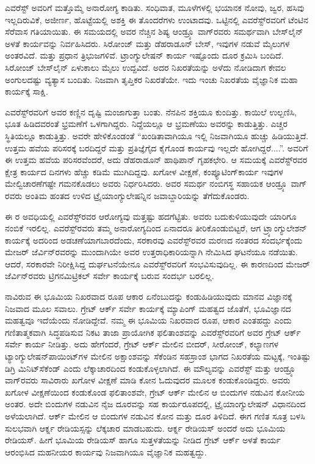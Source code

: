 ಎವರೆಸ್ಟ್​ ಅವರಿಗೆ ಮತ್ತೊಮ್ಮೆ ಅನಾರೋಗ್ಯ ಕಾಡಿತು. ಸಂಧಿವಾತ, ಮೂಳೆಗಳಲ್ಲಿ ಭಯಾನಕ ನೋವು, ಜ್ವರ, ಹಸಿವು ಇಲ್ಲದಿರುವಿಕೆ, ಅಜೀರ್ಣ, ಹೊಟ್ಟೆಯಲ್ಲಿ ಅಶಕ್ತಿ ಈ ತೊಂದರೆಗಳು ಉಂಟಾದವು. ಒಟ್ಟಿನಲ್ಲಿ ಎವರೆಸ್ಟ್​ರವರಿಗೆ ಟೆಂಟಿನ ಸೆರೆವಾಸ ಗತಿಯಾಯಿತು. ಈ ಸಮಯದಲ್ಲಿ ಅವರ ನೆಚ್ಚಿನ ಶಿಷ್ಯ ಆಂಡ್ರ್ಯೂ ವಾಗ್​ರವರು ಸಮರ್ಥವಾಗಿ ಬೇಸ್​ಲೈನ್​ ಅಳತೆ ಕಾರ್ಯವನ್ನು ನಿರ್ವಹಿಸಿದರು. ಸಿರೋಂಜ್​ ಮತ್ತು ಡೆಹರಾಡೂನ್​ ಬೇಸ್​, ಇವುಗಳ ನಡುವೆ  ಮೈಲುಗಳ ಅಂತರವಿದೆ. ಮತ್ತು  ಪ್ರಧಾನ ತ್ರಿಭುಜಗಳಿವೆ. ಟ್ರಾಂಗ್ಯುಲೇಷನ್​ ಕಾರ್ಯ ಇಷ್ಟೊಂದು ದೂರ ಕ್ರಮಿಸಿ ಬಂದಿದೆ. ಸಿರೋಂಜ್​ ಬೇಸ್​ ಲೈನ್​ ಏಳುಕಾಲು ಮೈಲು ಉದ್ದವಿದೆ. ಅದರ ನಿಖರತೆಯನ್ನು ಅಳೆದು ನೋಡಿದಾಗ ಕೇವಲ  ಅಂಗುಲದಷ್ಟು ವ್ಯತ್ಯಾಸ ಬಂದಿತು. ನಿಜವಾಗಿ ತೃಪ್ತಿಕರ ನಿಖರತೆಯೇ. ಇದು ಇಂಚು ನಿಖರತೆಯ ವೈಜ್ಞಾನಿಕ ಮಹಾ ಕಾರ್ಯಕ್ಕೆ ಸಾಕ್ಷಿ.

ಎವರೆಸ್ಟ್​ರವರಿಗೆ ಅವರ ಕಣ್ಣಿನ ದೃಷ್ಟಿ ಮಂಜಾಗುತ್ತಾ ಬಂತು. ನೆನಪಿನ ಶಕ್ತಿಯೂ ಕುಂದಿತ್ತು. ಕಾಯಿಲೆ ಉಲ್ಬಣಿಸಿ, ಭೂತ ಹಿಡಿದವರಂತೆ ಭ್ರಮಣೆಗೆ ಒಳಗಾಗಿದ್ದರು. ನಿದ್ದೆಯಲ್ಲೂ ಆ ಭ್ರಮಣೆಯು ಅವರನ್ನು ಕಾಡುತ್ತಿತ್ತು. ಎಚ್ಚರ ಸ್ಥಿತಿಯಲ್ಲೂ ಕಾಡುತ್ತಿತ್ತು. ಅವರೇ ಹೇಳಿಕೊಂಡಂತೆ “ಖಂಡಿತಾವಾಗಿಯೂ ಇಲ್ಲಿ ನಿಜವಾಗಿಯೂ ಹುಚ್ಚು ಹಿಡಿಯುತ್ತಿದೆ. ಉತ್ತಮ ಹವೆಯ ಪರಿಸರಕ್ಕೆ ಬರದಿದ್ದರೆ ಮತ್ತು ಪ್ರತಿಜ್ಞೆಗೈದ ಕೈಗೊಂಡ ಕಾರ್ಯವು ಇಲ್ಲದೇ ಹೋಗಿದ್ದರೆ....”. ಅವರಿಗೆ ಈ ಉತ್ತಮ ಹವೆಯ ಪರಿಸರವೆಂದರೆ, ಅದು ಡೆಹರಾಡೂನ್​ ಹಾಥಿಪಾನ್​ ಗೃಹಕಛೇರಿ. ಆ ಸಮಯಕ್ಕೆ ಎವರೆಸ್ಟ್​ರವರ ಕ್ಷೇತ್ರ ಕಾರ್ಯದ ದಿನಗಳು ಹೆಚ್ಚು ಕಡಿಮೆ ಮುಗಿದಿದ್ದವು. ಖಗೋಳ ವೀಕ್ಷಣೆ, ಕಂಪ್ಯೂಟಿಂಗ್​ ಕಾರ್ಯ ಇವುಗಳ ಮೇಲ್ವಿಚಾರಣೆಗಷ್ಟೇ ಗಮನಕೊಡಲು ಅವರು ನಿರ್ಧರಿಸಿದರು. ಅವರ ಸಮರ್ಥ ನಂಬಿಗಸ್ಥ ಸಹಾಯಕ ಆಂಡ್ರ್ಯೂ ವಾಗ್​ರವರು ಅಂತಿಮ ಹಂತದ ಉಳಿದ ಟ್ರೈಯಾಂಗ್ಯುಲೇಷನ್ನಿನ ಜವಾಬ್ದಾರಿಯನ್ನು ತೆಗೆದುಕೊಂಡರು.

ಈ ರ ಅವಧಿಯಲ್ಲಿ ಎವರೆಸ್ಟ್​ರವರ ಆರೋಗ್ಯವು ಮತ್ತಷ್ಟು ಹದಗೆಟ್ಟಿತು. ಅವರು ಬದುಕುಳಿಯುವುದೇ ಯಾರಿಗೂ ನಂಬಿಕೆ ಇರಲಿಲ್ಲ. ಎವರೆಸ್ಟ್​ರವರು ತಮ್ಮ ಅನಾರೋಗ್ಯದಿಂದ ಏನಾದರೂ ತೀರಿಕೊಂಡುಬಿಟ್ಟರೆ, ಆಗ ಟ್ರ್ಯಾಂಗ್ಯುಲೇಶನ್​ ಕಾರ್ಯಕ್ಕೆ ಅದರಿಂದ ಅಡಚಣೆಯಾಗಬಾರದೆಂದು, ಸರಕಾರವು ಎವರೆಸ್ಟ್​ರವರ ಮರಣದ ನಂತರದ ಸಂದರ್ಭಕ್ಕೆಂದು ಮೇಜರ್​ ಜೆರ್ವಿನ್​ರವರನ್ನು ಮುಂದಾಗಿಯೇ ಅವರ ಉತ್ತರಾಧಿಕಾರಿಯನ್ನಾಗಿ ನೇಮಿಸಿದ ಘಟನೆಯೂ ನಡೆಯಿತು. ಆದರೆ, ಸರಕಾರವೇ ನಿರೀಕ್ಷಿಸಿದ್ದ ದುರ್ಘಟನೆಯೇನೂ ಎವರೆಸ್ಟ್​\break ರವರಿಗೆ ಸಂಭವಿಸುವುದಿಲ್ಲ. ಈ ಕಾರಣದಿಂದ ಮೇಜರ್​ ಜೆರ್ವಿನ್​ರವರು ಟ್ರಿಗನಮಿಟ್ರಿಕಲ್​ ಸರ್ವೇ ಕಾರ್ಯಕ್ಕೆ ಬರುವ ಸಂದರ್ಭ ಬರಲಿಲ್ಲ.

ನಾವಿರುವ ಈ ಭೂಮಿಯ ನಿಖರವಾದ ರೂಪ ಆಕಾರ ಏನೆಂಬುದನ್ನು ಕಂಡುಹಿಡಿಯುವುದು ಮಾನವ ವಿಜ್ಞಾನಕ್ಕೆ ನಿಜವಾದ ಮೂಲ ಸವಾಲು. ಗ್ರೇಟ್​ ಆರ್ಕ್ ಸರ್ವೇ ಕಾರ್ಯಕ್ಕೆ ಮ್ಯಾಪಿಂಗ್​ ಮಹತ್ವದ ಜೊತೆಗೆ, ಭೂವಿಜ್ಞಾನದ ಮಹತ್ವವೂ ಇದೆಯೆಂದು ನೋಡಿದ್ದೇವೆ. ನಮ್ಮ ಈ ಭೂಮಿಯ ನಿಖರವಾದ ರೂಪ, ಆಕಾರ ಎಂತಹದ್ದು ಎಂದು ಗಣಿತಾತ್ಮಕವಾಗಿ ಸಿದ್ಧಪಡಿಸುವ ನಿಕಟ ತಾಜಾ ಪ್ರಾಯೋಗಿಕ ಫಲಿತಾಂಶವನ್ನು ಎವರೆಸ್ಟ್​ರವರಿಗೆ ಅವರ ಗ್ರೇಟ್​ ಆರ್ಕ್ ಸರ್ವೇ ಕಾರ್ಯ ನೀಡಿತ್ತು. ಅದು ಹೇಗೆಂದರೆ, ಗ್ರೇಟ್​ ಆರ್ಕ್ ಮೇಲಿನ ಬೀದರ್​, ಸೀರೋಂಜ್​, ಕಲ್ಯಾಣಗಳ ಟ್ಯಾಂಗ್ಯುಲೇಷನ್​ ಪಾಯಿಂಟ್​ಗಳ ಮೇಲಿನ ಅಕ್ಷಾಂಶವನ್ನು ಸೆಕೆಂಡಿನ ಸಹಸ್ರಾಂಶ ಭಾಗದ ನಿಖರತೆಯ ಮಟ್ಟಕ್ಕೆ, ಇಂತಿಷ್ಟು ಡಿಗ್ರಿ ಮಿನಿಟ್​ ಸೆಕೆಂಡ್​ ಎಂದು ಲೆಕ್ಕಾಚಾರದಿಂದ ಕಂಡುಕೊಳ್ಳಲಾಗಿದೆ. ಈ ಮೌಲ್ಯವನ್ನು ಎವರೆಸ್ಟ್​ ಮತ್ತು ಆಂಡ್ರ್ಯೂ ವಾಗ್​ರವರು ಸಾವಿರಾರು ಖಗೋಳ ವೀಕ್ಷಣೆ ಮಾಡಿ ಕೋನ ಓದುವುದರ ಮೂಲಕ ಕಂಡುಕೊಂಡಿದ್ದರು. ಅವರು ಖಗೋಳ ವೀಕ್ಷಣೆಯಿಂದ ಕಂಡುಕೊಂಡ ಫಲಿತಾಂಶವೇ, ಗ್ರೇಟ್​ ಆರ್ಕ್ ಮೇಲಿನ ಆ ಬಿಂದುಗಳ ನಡುವಿನ ಕೋನೀಯ ಅಂತರ. ಅದೇ ಬಿಂದುಗಳ ನಡುವಿನ ನೈಜ ದೂರವನ್ನು ಸಹ ಕಾರ್ಯರೂಪದಲ್ಲಿ, ಟ್ರೈಯಾಂಗ್ಯುಲೇಷನ್​ ವಿಧಾನದಿಂದ ಅಳೆಯಲಾಗಿದೆ. ಆರ್ಕ್ ಮೇಲಿನ ಆ ಬಿಂದುಗಳ ನಡುವಿನ ಕೋನ ಮತ್ತು ದೂರ ತಿಳಿದಿದೆ. ಈಗ ಗಣಿತ ಸೂತ್ರ ಬಳಸಿ ಸುಲಭವಾಗಿ ಆರ್ಕ್ನ ರೇಡಿಯಸ್ಸನ್ನು ಲೆಕ್ಕಚಾರ ಮಾಡಬಹುದು. ಆರ್ಕ್ನ ರೇಡಿಯಸ್​ ಅಂದರೆ ಅದು ಭೂಮಿಯ ರೇಡಿಯಸ್​. ಹೀಗೆ ಭೂಮಿಯ ರೇಡಿಯಸ್​ ಹಾಗೂ ಸುತ್ತಳತೆಯನ್ನು ನೀಡಿದ ಗ್ರೇಟ್​ ಆರ್ಕ್ ಅಳತೆ ಕಾರ್ಯ ಆರಂಭಿಸಿದ ಮಹನೀಯರ ಕಾರ್ಯವು ನಿಜವಾಗಿಯೂ ವೈಜ್ಞಾನಿಕ ಮಹತ್ವದ್ದು.

